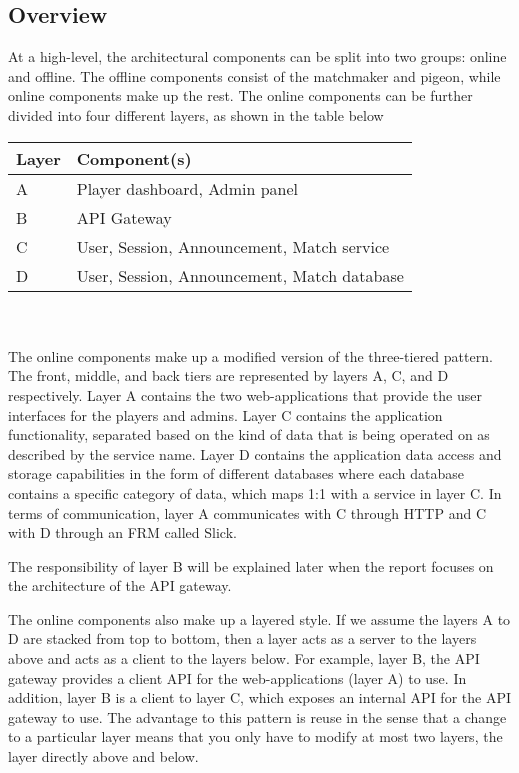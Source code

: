 \documentclass{article}
\begin{document}
\subsection{Overview}
At a high-level, the architectural components can be split into two groups: online and offline. The offline components consist of the matchmaker and pigeon, while online components make up the rest. The online components can be further divided into four different layers, as shown in the table below \\
\begin{tabular}{ | l | l | }
\hline
Layer & Component(s) \\
\hline
A & Player dashboard, Admin panel \\
B & API Gateway \\
C & User, Session, Announcement, Match service \\
D & User, Session, Announcement, Match database \\
\hline
\end{tabular} \\ \\
The online components make up a modified version of the three-tiered pattern. The front, middle, and back tiers are represented by layers A, C, and D respectively. Layer A contains the two web-applications that provide the user interfaces for the players and admins. Layer C contains the application functionality, separated based on the kind of data that is being operated on as described by the service name. Layer D contains the application data access and storage capabilities in the form of different databases where each database contains a specific category of data, which maps 1:1 with a service in layer C. In terms of communication, layer A communicates with C through HTTP and C with D through an FRM called Slick.

The responsibility of layer B will be explained later when the report focuses on the architecture of the API gateway.

The online components also make up a layered style. If we assume the layers A to D are stacked from top to bottom,
then a layer acts as a server to the layers above and acts as a client to the layers below. For example, layer B, the API gateway provides a client API for the web-applications (layer A) to use. In addition, layer B is a client to layer C, which exposes an internal API for the API gateway to use. The advantage to this pattern is reuse in the sense that a change to a particular layer means that you only have to modify at most two layers, the layer directly above and below.
\end{document}
